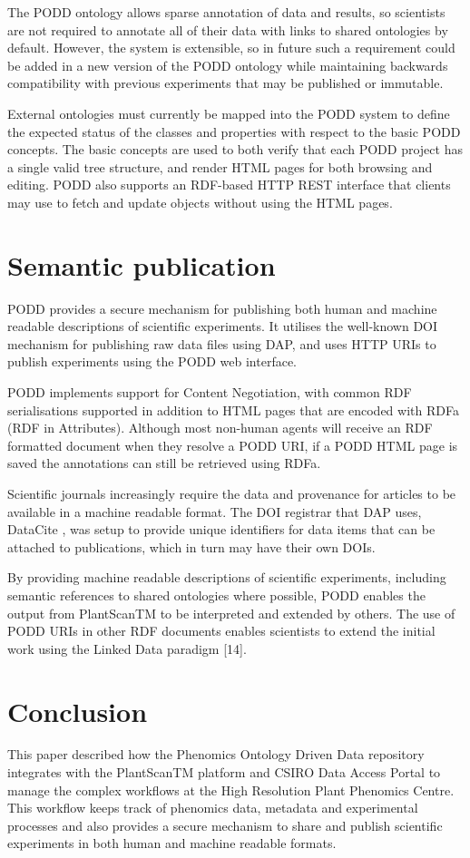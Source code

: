 \documentclass{llncs}
\begin{document}
The PODD ontology allows sparse annotation of data and results, so scientists
are not required to annotate all of their data with links to shared ontologies
by default. However, the system is extensible, so in future such a requirement
could be added in a new version of the PODD ontology while maintaining backwards
compatibility with previous experiments that may be published or immutable.


External ontologies must currently be mapped into the PODD system to define the
expected status of the classes and properties with respect to the basic PODD
concepts. The basic concepts are used to both verify that each PODD project has
a single valid tree structure, and render HTML pages for both browsing and
editing. PODD also supports an RDF-based HTTP REST interface that clients may
use to fetch and update objects without using the HTML pages.


\section{Semantic publication}
PODD provides a secure mechanism for publishing both human and machine readable
descriptions of scientific experiments. It utilises the well-known DOI mechanism
for publishing raw data files using DAP, and uses HTTP URIs to publish
experiments using the PODD web interface.


PODD implements support for Content Negotiation, with common RDF serialisations
supported in addition to HTML pages that are encoded with RDFa (RDF in
Attributes). Although most non-human agents will receive an RDF formatted
document when they resolve a PODD URI, if a PODD HTML page is saved the
annotations can still be retrieved using RDFa. 


Scientific journals increasingly require the data and provenance for articles to
be available in a machine readable format. The DOI registrar that DAP uses,
DataCite \cite{Brase2009}, was setup to provide unique identifiers for data items that can
be attached to publications, which in turn may have their own DOIs.


By providing machine readable descriptions of scientific experiments, including
semantic references to shared ontologies where possible, PODD enables the output
from PlantScanTM to be interpreted and extended by others. The use of PODD URIs
in other RDF documents enables scientists to extend the initial work using the
Linked Data paradigm [14].


\section{Conclusion}
This paper described how the Phenomics Ontology Driven Data repository
integrates with the PlantScanTM platform and CSIRO Data Access Portal to manage
the complex workflows at the High Resolution Plant Phenomics Centre. This
workflow keeps track of phenomics data, metadata and experimental processes and
also provides a secure mechanism to share and publish scientific experiments in
both human and machine readable formats.
\end{document}
